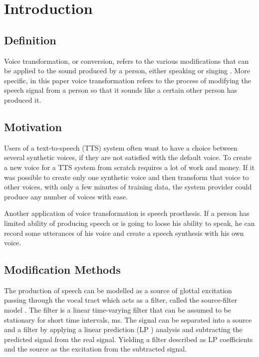 \chapter{Introduction} %
\label{cha:introduction}
  

\section{Definition} %
\label{sec:definition}
Voice transformation, or conversion, refers to the various modifications that can be applied to the sound produced by a person, either speaking or singing \cite{stylianou08}. More specific, in this paper voice transformation refers to the process of modifying the speech signal from a person so that it sounds like a certain other person has produced it. 

\section{Motivation} %
\label{sec:motivation}
Users of a text-to-speech (TTS) system often want to have a choice between several synthetic voices, if they are not satisfied with the default voice. To create a new voice for a TTS system from scratch requires a lot of work and money. If it was possible to create only one synthetic voice and then transform that voice to other voices, with only a few minutes of  training data, the system provider could produce any number of voices with ease. 

Another application of voice transformation is speech prosthesis. If a person has limited ability of producing speech or is going to loose his ability to speak, he can record some utterances of his voice and create a speech synthesis with his own voice.

\section{Modification Methods} %
\label{sec:synthesis_methods}
The production of speech can be modelled as a source of glottal excitation passing through the vocal tract which acts as a filter, called the source-filter model \cite{taletek}. The filter is a linear time-varying filter that can be assumed to be stationary for short time intervals,  ms. The signal can be separated into a source and a filter by applying a linear prediction (LP ) analysis and subtracting the predicted signal from the real signal. Yielding a filter described as LP coefficients and the source as the excitation from the subtracted signal.

